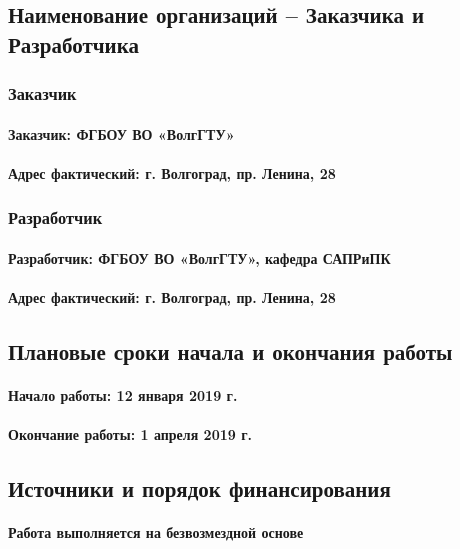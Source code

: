 \documentclass{article}
\begin{document}
    \subsection{Наименование организаций – Заказчика и Разработчика}
        \subsubsection{Заказчик}
            \paragraph{Заказчик: ФГБОУ ВО «ВолгГТУ»}
            \paragraph {Адрес фактический: г. Волгоград, пр. Ленина, 28 }
       
        \subsubsection{Разработчик}
            \paragraph{Разработчик: ФГБОУ ВО «ВолгГТУ», кафедра САПРиПК}
            \paragraph {Адрес фактический: г. Волгоград, пр. Ленина, 28 }
            
    \subsection{Плановые сроки начала и окончания работы}
        \paragraph{Начало работы: 12 января 2019 г.}
        \paragraph {Окончание работы: 1 апреля 2019 г. }
        
    \subsection{Источники и порядок финансирования}
        \paragraph{Работа выполняется на безвозмездной основе}
        
\end{document}
